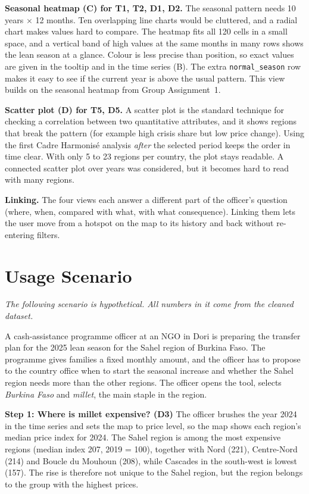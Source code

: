 \documentclass{article}
\begin{document}
\textbf{Seasonal heatmap (C) for T1, T2, D1, D2.} The seasonal pattern needs 10 years $\times$ 12 months. Ten overlapping line charts would be cluttered, and a radial chart makes values hard to compare. The heatmap fits all 120 cells in a small space, and a vertical band of high values at the same months in many rows shows the lean season at a glance. Colour is less precise than position, so exact values are given in the tooltip and in the time series (B). The extra \texttt{normal\_season} row makes it easy to see if the current year is above the usual pattern. This view builds on the seasonal heatmap from Group Assignment~1.

\textbf{Scatter plot (D) for T5, D5.} A scatter plot is the standard technique for checking a correlation between two quantitative attributes, and it shows regions that break the pattern (for example high crisis share but low price change). Using the first Cadre Harmonis\'e analysis \emph{after} the selected period keeps the order in time clear. With only 5 to 23 regions per country, the plot stays readable. A connected scatter plot over years was considered, but it becomes hard to read with many regions.

\textbf{Linking.} The four views each answer a different part of the officer's question (where, when, compared with what, with what consequence). Linking them lets the user move from a hotspot on the map to its history and back without re-entering filters.

\section{Usage Scenario}

\emph{The following scenario is hypothetical. All numbers in it come from the cleaned dataset.}

A cash-assistance programme officer at an NGO in Dori is preparing the transfer plan for the 2025 lean season for the Sahel region of Burkina Faso. The programme gives families a fixed monthly amount, and the officer has to propose to the country office when to start the seasonal increase and whether the Sahel region needs more than the other regions. The officer opens the tool, selects \emph{Burkina Faso} and \emph{millet}, the main staple in the region.

\textbf{Step 1: Where is millet expensive? (D3)} The officer brushes the year 2024 in the time series and sets the map to price level, so the map shows each region's median price index for 2024. The Sahel region is among the most expensive regions (median index 207, 2019 = 100), together with Nord (221), Centre-Nord (214) and Boucle du Mouhoun (208), while Cascades in the south-west is lowest (157). The rise is therefore not unique to the Sahel region, but the region belongs to the group with the highest prices.
\end{document}
